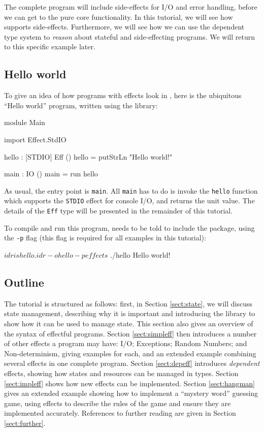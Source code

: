 The complete program will include side-effects for I/O and error handling,
before we can get to the pure core functionality. In this tutorial, we will
see how \Idris{} supports side-effects. Furthermore, we will see how we can 
use the dependent type system to \emph{reason} about stateful and
side-effecting programs. We will return to this specific example later.

\subsection{Hello world}

To give an idea of how programs with effects look in \Idris{}, here is the
ubiquitous ``Hello world'' program, written using the \effects{} library:

\begin{code}
module Main
  
import Effect.StdIO
  
hello : { [STDIO] } Eff ()
hello = putStrLn "Hello world!"
  
main : IO ()
main = run hello
\end{code}

\noindent
As usual, the entry point is \texttt{main}. All \texttt{main} has to do is
invoke the \texttt{hello} function which supports the \texttt{STDIO} effect
for console I/O, and returns the unit
value. The details of the \texttt{Eff} type will be presented in the
remainder of this tutorial.

To compile and run this program, \Idris{} needs to be told to include the
\effects{} package, using the \texttt{-p} \effects{} flag (this flag
is required for all examples in this tutorial):

\begin{code}
$ idris hello.idr -o hello -p effects
$ ./hello
Hello world!
\end{code}

\subsection{Outline}

The tutorial is structured as follows: first, in Section \ref{sect:state},
we will discuss state management, describing why it is important and introducing
the \effects{} library to show how it can be used to manage state. This section
also gives an overview of the syntax of effectful programs. Section
\ref{sect:simpleff} then introduces a number of other effects a program may
have: I/O; Exceptions; Random Numbers; and Non-determinism, giving examples
for each, and an extended example combining several effects in one complete
program. Section \ref{sect:depeff} introduces \emph{dependent} effects, showing
how states and resources can be managed in types. Section \ref{sect:impleff}
shows how new effects can be implemented. Section \ref{sect:hangman}
gives an extended example showing how to implement a ``mystery word'' guessing
game, using effects to describe the rules of the game and ensure they are
implemented accurately. References to further reading are given in
Section \ref{sect:further}.



